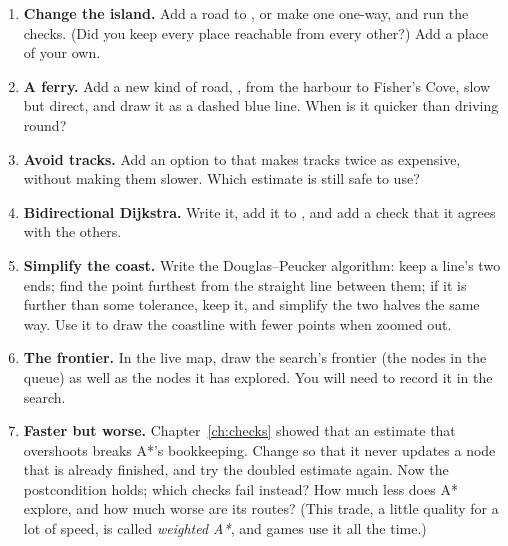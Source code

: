 \begin{enumerate}
  \item \textbf{Change the island.} Add a road to ,
    or make one one-way, and run the checks. (Did you keep every place
    reachable from every other?) Add a place of your own.
  \item \textbf{A ferry.} Add a new kind of road, , from the
    harbour to Fisher's Cove, slow but direct, and draw it as a dashed
    blue line. When is it quicker than driving round?
  \item \textbf{Avoid tracks.} Add an option to  that
    makes tracks twice as expensive, without making them slower. Which
    estimate is still safe to use?
  \item \textbf{Bidirectional Dijkstra.} Write it, add it to
    , and add a check that it agrees with the others.
  \item \textbf{Simplify the coast.} Write the Douglas--Peucker algorithm:
    keep a line's two ends; find the point furthest from the straight line
    between them; if it is further than some tolerance, keep it, and
    simplify the two halves the same way. Use it to draw the coastline
    with fewer points when zoomed out.
  \item \textbf{The frontier.} In the live map, draw the search's frontier
    (the nodes in the queue) as well as the nodes it has explored. You will
    need to record it in the search.
  \item \textbf{Faster but worse.} Chapter~\ref{ch:checks} showed that an
    estimate that overshoots breaks A*'s bookkeeping. Change 
    so that it never updates a node that is already finished, and try the
    doubled estimate again. Now the postcondition holds; which checks fail
    instead? How much less does A* explore, and how much worse are its
    routes? (This trade, a little quality for a lot of speed, is called
    \emph{weighted A*}, and games use it all the time.)
\end{enumerate}
